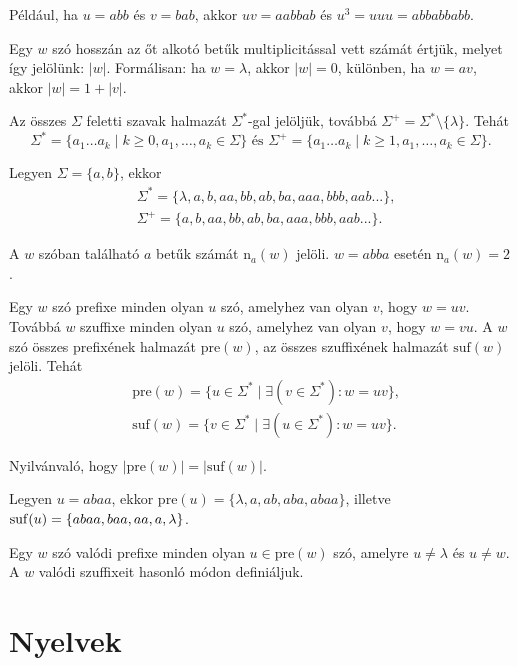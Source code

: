 \documentclass[12pt]{report}
\theoremstyle{definition}
\newcommand{\n}{\mathrm{n}}
\newcommand{\pre}{\mathrm{pre}}
\newcommand{\suf}{\mathrm{suf}}
\begin{document}
\noindent Például, ha $u = abb$ és $v = bab$, akkor $uv = aabbab$ és $u^3 = uuu = abbabbabb$.

Egy $w$ szó hosszán az őt alkotó betűk multiplicitással vett számát értjük, melyet így jelölünk: $|w|$. Formálisan: ha   $w = \lambda$, akkor $|w| = 0$, különben, ha $w = av$, akkor $|w| = 1 + |v|$.

Az összes $\Sigma$ feletti szavak halmazát $\Sigma^*$-gal jelöljük, továbbá $\Sigma^+=\Sigma^*\setminus \{\lambda\}$. Tehát
\begin{equation*}
\Sigma^*=\{a_1\ldots a_k\mid k\geq 0,a_1,\ldots,a_k\in\Sigma\}\text{ és } \Sigma^+=\{a_1\ldots a_k\mid k\geq 1,a_1,\ldots,a_k\in\Sigma\}.
\end{equation*}


\noindent Legyen $\Sigma=\{a,b\}$, ekkor
\begin{equation*}
\begin{split}
 &\Sigma^*=\{\lambda,a,b,aa,bb,ab,ba,aaa,bbb,aab...\},\\& \Sigma^+=\{a,b,aa,bb,ab,ba,aaa,bbb,aab...\}.
\end{split}
\end{equation*}

A $w$ szóban található $a$ betűk számát $\n_a (w)$ jelöli. $w=abba$ esetén $\n_a (w)=2$.

Egy $w$ szó prefixe minden olyan $u$ szó, amelyhez van olyan $v$, hogy $w=uv$. Továbbá $w$ szuffixe minden olyan $u$ szó, amelyhez van olyan $v$, hogy $w=vu$. A $w$ szó összes prefixének halmazát $\pre(w)$, az összes szuffixének halmazát $\suf(w)$ jelöli. Tehát
\begin{equation*}
\begin{split}
 &\pre(w)=\{u\in\Sigma^*\mid \exists(v\in \Sigma^*): w=uv\},\\& 
 \suf(w)=\{v\in\Sigma^*\mid \exists(u\in \Sigma^*): w=uv\}.
\end{split}
\end{equation*}


\noindent Nyilvánvaló, hogy $|\pre(w)| = |\suf(w)|$.


\noindent Legyen $u = abaa$, ekkor $\pre(u) =\{\lambda,a,ab,aba,abaa\}$, illetve $\suf(u) = \{abaa,baa,\\aa,a,\lambda\}$.

\noindent Egy $w$ szó valódi prefixe minden olyan $u\in \pre(w)$ szó, amelyre $u\neq\lambda$ és $u\neq w$. A $w$ valódi szuffixeit hasonló módon definiáljuk.

\section{Nyelvek}
\end{document}
